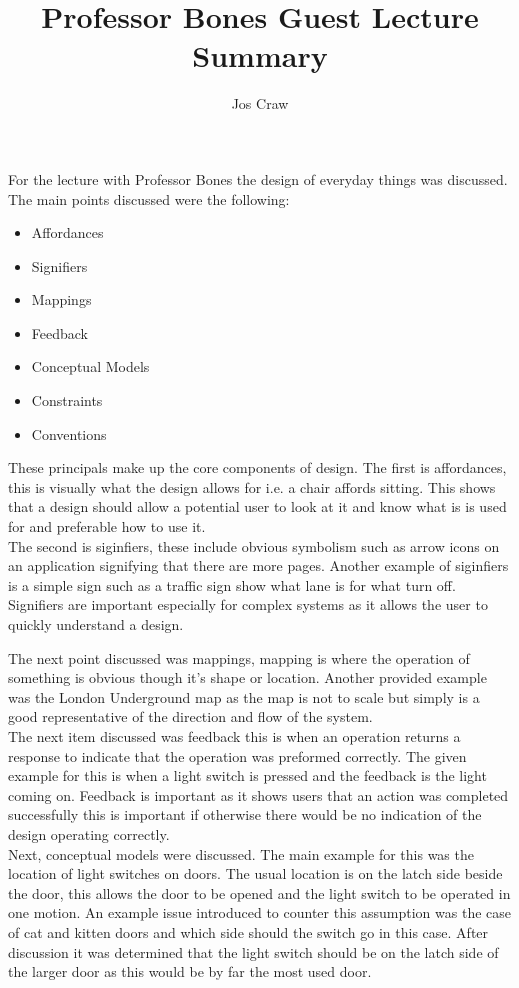 \documentclass{article}
\title{Professor Bones Guest Lecture Summary}
\author{Jos Craw}
\begin{document}
\maketitle{}
For the lecture with Professor Bones the design of everyday things was discussed. The main points
discussed were the following:

\begin{itemize}
    \item{Affordances}
    \item{Signifiers}
    \item{Mappings}
    \item{Feedback}
    \item{Conceptual Models}
    \item{Constraints}
    \item{Conventions}
\end{itemize}

These principals make up the core components of design. The first is affordances, this is visually
what the design allows for i.e. a chair affords sitting. This shows that a design should allow a
potential user to look at it and know what is is used for and preferable how to use it.\\

The second is siginfiers, these include obvious symbolism such as arrow icons on an application
signifying that there are more pages. Another example of siginfiers is a simple sign such as a
traffic sign show what lane is for what turn off. Signifiers are important especially for complex
systems as it allows the user to quickly understand a design.

The next point discussed was mappings, mapping is where the operation of something is
obvious though it's shape or location. Another provided example was the London Underground map as
the map is not to scale but simply is a good representative of the direction and flow of the
system.\\

The next item discussed was feedback this is when an operation returns a response to indicate that
the operation was preformed correctly. The given example for this is when a light switch is
pressed and the feedback is the light coming on. Feedback is important as it shows users that an
action was completed successfully this is important if otherwise there would be no indication of
the design operating correctly.\\

Next, conceptual models were discussed. The main example for this was the location of light
switches on doors. The usual location is on the latch side beside the door, this allows the door
to be opened and the light switch to be operated in one motion. An example issue introduced to
counter this assumption was the case of cat and kitten doors and which side should the switch go
in this case. After discussion it was determined that the light switch should be on the latch side
of the larger door as this would be by far the most used door.\\
\end{document}

